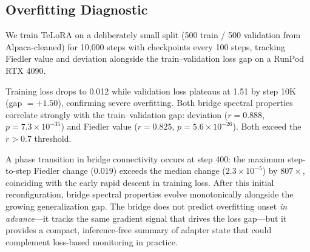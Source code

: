 \subsection{Overfitting Diagnostic}
\label{sec:exp-overfit}

We train TeLoRA on a
deliberately small split (500 train / 500 validation from Alpaca-cleaned)
for 10{,}000 steps with checkpoints every 100 steps, tracking Fiedler value
and deviation alongside the train--validation loss gap on a RunPod RTX 4090.

Training loss drops to 0.012 while validation loss plateaus at 1.51 by
step 10K (gap $= +1.50$), confirming severe overfitting. Both bridge
spectral properties correlate strongly with the train--validation gap:
deviation ($r = 0.888$, $p = 7.3 \times 10^{-35}$) and Fiedler value
($r = 0.825$, $p = 5.6 \times 10^{-26}$). Both exceed the $r > 0.7$
threshold.

A phase transition in bridge connectivity occurs at step 400: the
maximum step-to-step Fiedler change ($0.019$) exceeds the median
change ($2.3 \times 10^{-5}$) by $807\times$, coinciding with the
early rapid descent in training loss. After this initial reconfiguration,
bridge spectral properties evolve monotonically alongside the growing
generalization gap. The bridge does not predict overfitting onset
\emph{in advance}---it tracks the same gradient signal that drives the
loss gap---but it provides a compact, inference-free summary of adapter
state that could complement loss-based monitoring in practice.
